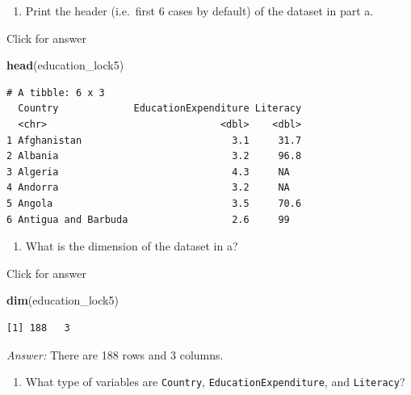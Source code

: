\documentclass[
]{book}
\newenvironment{Shaded}{\begin{snugshade}}{\end{snugshade}}
\newcommand{\FunctionTok}[1]{\textcolor[rgb]{0.13,0.29,0.53}{\textbf{#1}}}
\newcommand{\NormalTok}[1]{#1}
\providecommand{\tightlist}{%
  \setlength{\itemsep}{0pt}\setlength{\parskip}{0pt}}
\begin{document}
\begin{enumerate}
\def\labelenumi{\alph{enumi}.}
\setcounter{enumi}{1}
\tightlist
\item
  Print the header (i.e.~first 6 cases by default) of the dataset in part a.
\end{enumerate}

Click for answer

\begin{Shaded}
\begin{Highlighting}[]
\FunctionTok{head}\NormalTok{(education\_lock5)}
\end{Highlighting}
\end{Shaded}

\begin{verbatim}
# A tibble: 6 x 3
  Country             EducationExpenditure Literacy
  <chr>                              <dbl>    <dbl>
1 Afghanistan                          3.1     31.7
2 Albania                              3.2     96.8
3 Algeria                              4.3     NA  
4 Andorra                              3.2     NA  
5 Angola                               3.5     70.6
6 Antigua and Barbuda                  2.6     99  
\end{verbatim}

\begin{enumerate}
\def\labelenumi{\alph{enumi}.}
\setcounter{enumi}{2}
\tightlist
\item
  What is the dimension of the dataset in a?
\end{enumerate}

Click for answer

\begin{Shaded}
\begin{Highlighting}[]
\FunctionTok{dim}\NormalTok{(education\_lock5)}
\end{Highlighting}
\end{Shaded}

\begin{verbatim}
[1] 188   3
\end{verbatim}

\emph{Answer:} There are 188 rows and 3 columns.

\begin{enumerate}
\def\labelenumi{\alph{enumi}.}
\setcounter{enumi}{3}
\tightlist
\item
  What type of variables are \texttt{Country}, \texttt{EducationExpenditure}, and \texttt{Literacy}?
\end{enumerate}
\end{document}
